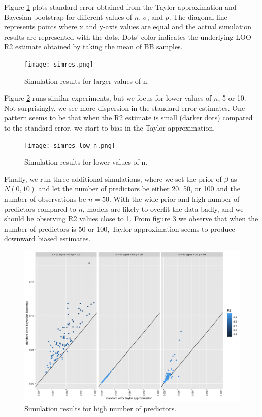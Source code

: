 \documentclass{article}
\begin{document}
Figure \ref{fig:simres} plots standard error obtained from the Taylor approximation and Bayesian bootstrap for different values of $n$, $\sigma$, and $p$. The diagonal line represents points where x and y-axis values are equal and the actual simulation results are represented with the dots. Dots' color indicates the underlying LOO-R2 estimate obtained by taking the mean of BB samples.
\begin{figure}
    \centering
    \texttt{[image: simres.png]}
    \caption{ Simulation results for larger values of n.}
    \label{fig:simres}
\end{figure}

Figure \ref{fig:simres_low_n} runs similar experiments, but we focus for lower values of $n$, 5 or 10. Not surprisingly, we see more dispersion in the standard error estimates. One pattern seems to be that when the R2 estimate is small (darker dots) compared to the standard error, we start to bias in the Taylor approximation.

\begin{figure}
    \centering
    \texttt{[image: simres\_low\_n.png]}
    \caption{ Simulation results for lower values of n.}
    \label{fig:simres_low_n}
\end{figure}

Finally, we run three additional simulations, where we set the prior of $\beta$ as $N(0, 10)$ and let the number of predictors be either 20, 50, or 100 and the number of observations be $n = 50$. With the wide prior and high number of predictors compared to $n$, models are likely to overfit the data badly, and we should be observing R2 values close to 1. From figure \ref{fig:simres_high_p} we observe that when the number of predictors is 50 or 100, Taylor approximation seems to produce downward biased estimates.

\begin{figure}
    \centering
    \includegraphics[width=\textwidth]{simres_high_p_n50.png}
    \caption{ Simulation results for high number of predictors.}
    \label{fig:simres_high_p}
\end{figure}

\newpage


\end{document}
